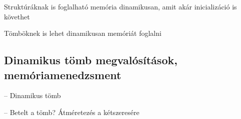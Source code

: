 \documentclass[usenames,dvipsnames,aspectratio=169]{beamer}
\begin{document}
\begin{frame}
  Struktúráknak is foglalható memória dinamikusan, amit akár inicializáció is követhet
  \begin{exampleblock}{}
    \footnotesize
    \vspace{-0.2cm}
    
    
    \vspace{-0.2cm}
  \end{exampleblock}
\end{frame}

\begin{frame}
  Tömböknek is lehet dinamikusan memóriát foglalni
  \begin{exampleblock}{}
    \footnotesize
    
  \end{exampleblock}
\end{frame}

\subsection{Dinamikus tömb megvalósítások, memóriamenedzsment}
\begin{frame}
  \begin{exampleblock}{ -- Dinamikus tömb}
    
  \end{exampleblock}
\end{frame}

\begin{frame}
  \small
  \begin{exampleblock}{ -- Betelt a tömb? Átméretezés a kétszeresére}
    \vspace{-.2cm}
    
    \vspace{-.2cm}
  \end{exampleblock}
\end{frame}

\begin{frame}
  \begin{exampleblock}{}
    
  \end{exampleblock}
\end{frame}
\end{document}
